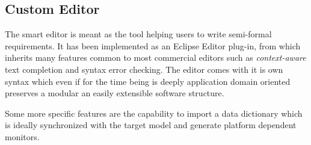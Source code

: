 \subsection{Custom Editor}
The smart editor is meant as the tool helping users to write semi-formal requirements. It has been implemented as an Eclipse Editor plug-in, from which inherits many features common to most commercial editors such as \textit{context-aware} text completion and syntax error checking. The editor comes with it is own syntax which even if for the time being is deeply application domain oriented preserves a modular an easily extensible software structure.
\par Some more specific features are the capability to import a data dictionary which is ideally synchronized with the target model and generate platform dependent monitors. 